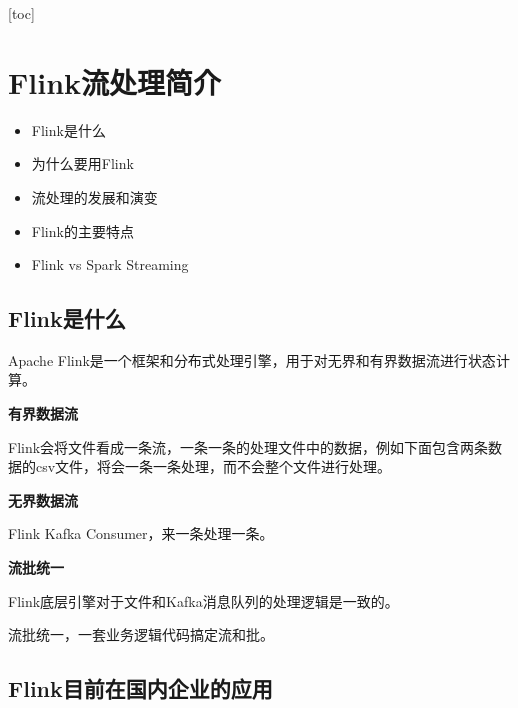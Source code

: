{[}toc{]}

\hypertarget{flinkux6d41ux5904ux7406ux7b80ux4ecb}{%
\section{Flink流处理简介}\label{flinkux6d41ux5904ux7406ux7b80ux4ecb}}

\begin{itemize}
\tightlist
\item
  Flink是什么
\item
  为什么要用Flink
\item
  流处理的发展和演变
\item
  Flink的主要特点
\item
  Flink vs Spark Streaming
\end{itemize}

\hypertarget{flinkux662fux4ec0ux4e48}{%
\subsection{Flink是什么}\label{flinkux662fux4ec0ux4e48}}

Apache
Flink是一个框架和{分布式}处理引擎，用于对无界和有界数据{流}进行{状态}计算。

\textbf{有界数据流}

Flink会将文件看成一条流，一条一条的处理文件中的数据，例如下面包含两条数据的csv文件，将会一条一条处理，而不会整个文件进行处理。

\begin{Shaded}
\begin{Highlighting}[]
\end{Highlighting}
\end{Shaded}

\textbf{无界数据流}

Flink Kafka Consumer，来一条处理一条。

\textbf{流批统一}

Flink底层引擎对于文件和Kafka消息队列的处理逻辑是一致的。

流批统一，一套业务逻辑代码搞定流和批。

\hypertarget{flinkux76eeux524dux5728ux56fdux5185ux4f01ux4e1aux7684ux5e94ux7528}{%
\subsection{Flink目前在国内企业的应用}\label{flinkux76eeux524dux5728ux56fdux5185ux4f01ux4e1aux7684ux5e94ux7528}}

